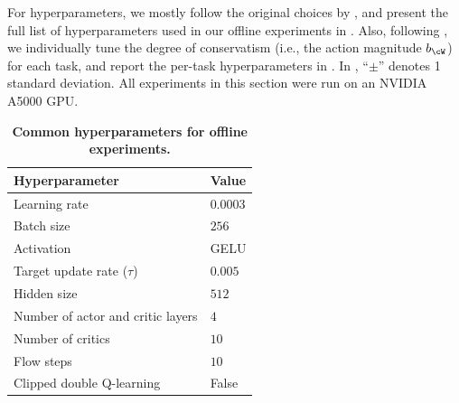 For hyperparameters, we mostly follow the original choices by \citet{park2025flow},
and present the full list of hyperparameters used in our offline experiments in .
Also, following \citet{park2025flow}, we individually tune the degree of conservatism (i.e., the action magnitude $\actmag$) for each task, and report the per-task hyperparameters in .
In , ``$\pm$'' denotes 1 standard deviation. All experiments in this section were run on an NVIDIA A5000 GPU.


\begin{table}
\caption{
\footnotesize
\textbf{Common \algname hyperparameters for offline experiments.}
}
\vspace{5pt}
\label{table:offline_hyp}
\begin{center}
\scalebox{0.9}
{
\begin{tabular}{ll}
    \toprule
    \textbf{Hyperparameter} & \textbf{Value} \\
    \midrule
    Learning rate & $0.0003$ \\
    Batch size & $256$ \\
    Activation & GELU \\
    Target update rate ($\tau$) & $0.005$ \\
    Hidden size & $512$ \\
    Number of actor and critic layers & $4$ \\
    Number of critics & $10$ \\
    Flow steps & $10$ \\
    Clipped double Q-learning & False \\
    \bottomrule
\end{tabular}
}
\end{center}
\end{table} 

